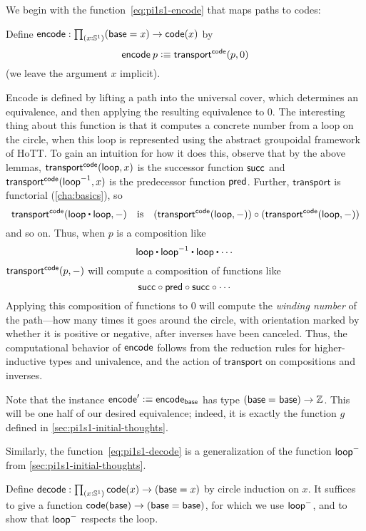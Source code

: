 We begin with the function~\eqref{eq:pi1s1-encode} that maps paths to codes:
\begin{defn}
Define $\encode : \prd{x : \Sn ^1} (\base=x) \rightarrow  \code(x)$ by 
\[
\mathsf{encode} \: p \vcentcolon\equiv \mathsf{transport}^{\mathsf{code}}(p,0)
\]
(we leave the argument $x$ implicit).  
\end{defn}
Encode is defined by lifting a path into the universal cover, which
determines an equivalence, and then applying the resulting equivalence
to $0$.  
The interesting thing about this function is that it computes a concrete
number from a loop on the circle, when this loop is represented using
the abstract groupoidal framework of HoTT.  To gain an
intuition for how it does this, observe that by the above lemmas,
$\mathsf{transport}^{\mathsf{code}}(\mathsf{loop},x)$ is the successor function $\mathsf{succ}$ and $\mathsf{transport}^{\mathsf{code}}(\mathord{{\mathsf{loop}}^{-1}},x)$ is the predecessor function $\mathsf{pred}$.
Further, $\mathsf{transport}$ is functorial (\autoref{cha:basics}), so
\[\transfib{\code} {\lloop \ct \lloop}{-}
\quad\text{is}\quad
(\transfib \code \lloop-) \circ (\transfib \code \lloop-)\]
and so on.
Thus, when $p$ is a composition like 
\[
\lloop \ct \opp \lloop \ct \lloop \ct \cdots
\]
$\mathsf{transport}^{\mathsf{code}}(p,-)$ will compute a composition of functions like
\[
\mathsf{succ} \circ \mathsf{pred} \circ \mathsf{succ} \circ \cdots 
\]
Applying this composition of functions to 0 will compute the
\emph{winding number} of the path---how many times it goes around the
circle, with orientation marked by whether it is positive or negative,
after inverses have been canceled.  Thus, the computational behavior of
$\mathsf{encode}$ follows from the reduction rules for higher-inductive types and
univalence, and the action of $\mathsf{transport}$ on compositions and inverses.

Note that the instance $\mathsf{encode}' \vcentcolon\equiv \mathsf{encode}_{\mathsf{base}}$ has type 
$(\mathsf{base} =_{} \mathsf{base}) \rightarrow \mathbb{Z}$.
This will be one half of our desired equivalence; indeed, it is exactly the function $g$ defined in \autoref{sec:pi1s1-initial-thoughts}.

Similarly, the function~\eqref{eq:pi1s1-decode} is a generalization of the function $\mathsf{loop}^-$ from \autoref{sec:pi1s1-initial-thoughts}.

\begin{defn}\label{thm:pi1s1-decode}
Define $\decode : \prd{x : \Sn ^1}\code(x) \rightarrow (\base=x)$ by 
circle induction on $x$.  It suffices to give a function 
${\mathsf{code}(\mathsf{base}) \rightarrow (\mathsf{base}=\mathsf{base})}$, for which we use $\mathsf{loop}^-$, and 
to show that $\mathsf{loop}^-$ respects the loop.  
\end{defn}

